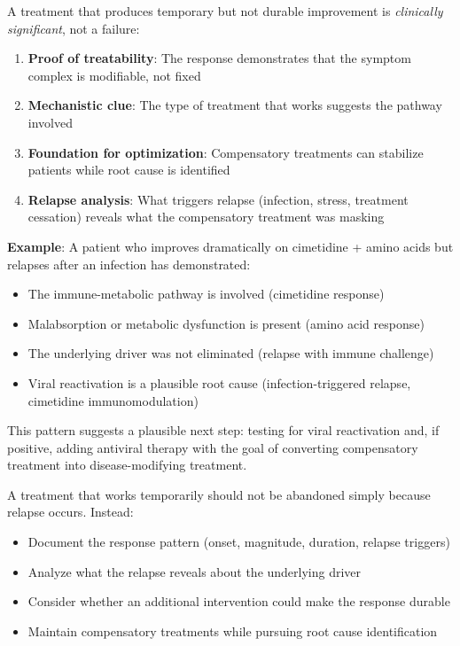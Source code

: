 \begin{observation}
\label{obs:temporary-improvement}
A treatment that produces temporary but not durable improvement is \emph{clinically significant}, not a failure:

\begin{enumerate}
    \item \textbf{Proof of treatability}: The response demonstrates that the symptom complex is modifiable, not fixed
    \item \textbf{Mechanistic clue}: The type of treatment that works suggests the pathway involved
    \item \textbf{Foundation for optimization}: Compensatory treatments can stabilize patients while root cause is identified
    \item \textbf{Relapse analysis}: What triggers relapse (infection, stress, treatment cessation) reveals what the compensatory treatment was masking
\end{enumerate}

\textbf{Example}: A patient who improves dramatically on cimetidine + amino acids but relapses after an infection has demonstrated:
\begin{itemize}
    \item The immune-metabolic pathway is involved (cimetidine response)
    \item Malabsorption or metabolic dysfunction is present (amino acid response)
    \item The underlying driver was not eliminated (relapse with immune challenge)
    \item Viral reactivation is a plausible root cause (infection-triggered relapse, cimetidine immunomodulation)
\end{itemize}

This pattern suggests a plausible next step: testing for viral reactivation and, if positive, adding antiviral therapy with the goal of converting compensatory treatment into disease-modifying treatment.
\end{observation}

\begin{warning}
\label{warn:premature-failure}
A treatment that works temporarily should not be abandoned simply because relapse occurs. Instead:
\begin{itemize}
    \item Document the response pattern (onset, magnitude, duration, relapse triggers)
    \item Analyze what the relapse reveals about the underlying driver
    \item Consider whether an additional intervention could make the response durable
    \item Maintain compensatory treatments while pursuing root cause identification
\end{itemize}
\end{warning}

